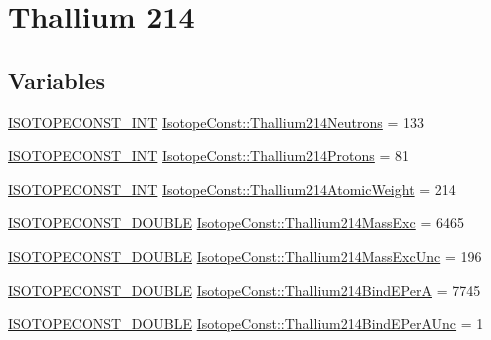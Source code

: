 \hypertarget{group___isotope_const-_thallium-_tl214}{}\section{Thallium 214}
\label{group___isotope_const-_thallium-_tl214}
\subsection*{Variables}
\begin{DoxyCompactItemize}
\item 
\mbox{\hyperlink{group___isotope_const-_macros_ga5f18360b3e99483a35c32d789e62621c}{I\+S\+O\+T\+O\+P\+E\+C\+O\+N\+S\+T\+\_\+\+I\+NT}} \mbox{\hyperlink{group___isotope_const-_thallium-_tl214_gaecd7dfa1c3ddb2719cca14ac62c6450b}{Isotope\+Const\+::\+Thallium214\+Neutrons}} = 133
\item 
\mbox{\hyperlink{group___isotope_const-_macros_ga5f18360b3e99483a35c32d789e62621c}{I\+S\+O\+T\+O\+P\+E\+C\+O\+N\+S\+T\+\_\+\+I\+NT}} \mbox{\hyperlink{group___isotope_const-_thallium-_tl214_gaa71b14e0733fa946e3e21ad476ca70b6}{Isotope\+Const\+::\+Thallium214\+Protons}} = 81
\item 
\mbox{\hyperlink{group___isotope_const-_macros_ga5f18360b3e99483a35c32d789e62621c}{I\+S\+O\+T\+O\+P\+E\+C\+O\+N\+S\+T\+\_\+\+I\+NT}} \mbox{\hyperlink{group___isotope_const-_thallium-_tl214_ga4b3fe6ba5fe0a303f103ea2f43c463ea}{Isotope\+Const\+::\+Thallium214\+Atomic\+Weight}} = 214
\item 
\mbox{\hyperlink{group___isotope_const-_macros_ga8f45a7272ce02c0b4c65c44636ed719a}{I\+S\+O\+T\+O\+P\+E\+C\+O\+N\+S\+T\+\_\+\+D\+O\+U\+B\+LE}} \mbox{\hyperlink{group___isotope_const-_thallium-_tl214_ga111adf74c63968d9cc1edbecd0f7b1ef}{Isotope\+Const\+::\+Thallium214\+Mass\+Exc}} = 6465
\item 
\mbox{\hyperlink{group___isotope_const-_macros_ga8f45a7272ce02c0b4c65c44636ed719a}{I\+S\+O\+T\+O\+P\+E\+C\+O\+N\+S\+T\+\_\+\+D\+O\+U\+B\+LE}} \mbox{\hyperlink{group___isotope_const-_thallium-_tl214_gabc3cdd86d7ce034617119abae9aa0b35}{Isotope\+Const\+::\+Thallium214\+Mass\+Exc\+Unc}} = 196
\item 
\mbox{\hyperlink{group___isotope_const-_macros_ga8f45a7272ce02c0b4c65c44636ed719a}{I\+S\+O\+T\+O\+P\+E\+C\+O\+N\+S\+T\+\_\+\+D\+O\+U\+B\+LE}} \mbox{\hyperlink{group___isotope_const-_thallium-_tl214_ga77754dab7a90b1d5572b1a8aa0ff7071}{Isotope\+Const\+::\+Thallium214\+Bind\+E\+PerA}} = 7745
\item 
\mbox{\hyperlink{group___isotope_const-_macros_ga8f45a7272ce02c0b4c65c44636ed719a}{I\+S\+O\+T\+O\+P\+E\+C\+O\+N\+S\+T\+\_\+\+D\+O\+U\+B\+LE}} \mbox{\hyperlink{group___isotope_const-_thallium-_tl214_gafa2a2105ef8687c2aedb7fb8b2be18a1}{Isotope\+Const\+::\+Thallium214\+Bind\+E\+Per\+A\+Unc}} = 1

\end{DoxyCompactItemize}
